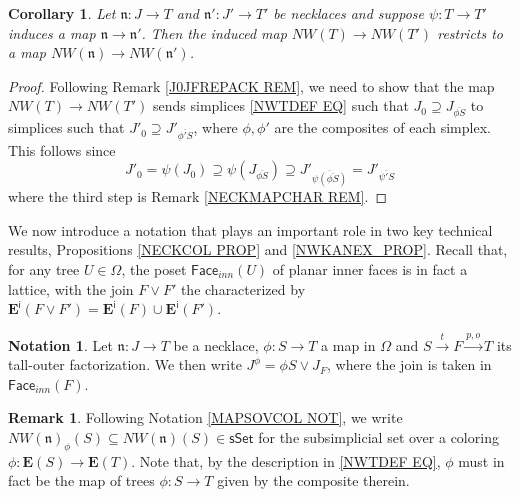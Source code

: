 \documentclass[a4paper,10pt]{article}%
\numberwithin{equation}{section}
\numberwithin{figure}{section}
\newtheorem{corollary}[equation]{Corollary}%
\theoremstyle{definition} %
\newtheorem{remark}[equation]{Remark}%
\newtheorem{notation}[equation]{Notation}%
\newcommand{\sSet}{\mathsf{sSet}}
\begin{document}
\begin{corollary}\label{NWTNS_NNAT_COR}
	Let $\mathfrak{n} \colon J \to T$ and
	$\mathfrak{n}' \colon J' \to T'$
	be necklaces and suppose 
	$\psi \colon T\to T'$
	induces a map $\mathfrak{n} \to \mathfrak{n}'$.
%	
	Then the induced map
	$NW(T) \to NW(T')$
	restricts to a map
	$NW(\mathfrak{n}) \to NW(\mathfrak{n}')$.
\end{corollary}



\begin{proof}
	Following Remark \ref{J0JFREPACK REM},
	we need to show that the map
	$NW(T) \to NW(T')$
	sends simplices \eqref{NWTDEF EQ}
	such that
	$J_0 \supseteq 
	J_{\overline{\phi S}}$
	to simplices such that
	$J'_0 \supseteq 
	J'_{\overline{\phi' S}}$,
	where $\phi,\phi'$ are the composites of each simplex.
	This follows since
\[
	J'_0 = 
	\psi (J_0) \supseteq
	\psi (J_{\overline{\phi S}})
	\supseteq
	J'_{\overline{\psi (\overline{\phi S})}}
	=
	J'_{\overline{\psi' S}}
\]	
where the third step is
Remark \ref{NECKMAPCHAR REM}.
\end{proof}



We now introduce a notation that plays an important role 
in two key technical results,
Propositions \ref{NECKCOL PROP} and 
\ref{NWKANEX_PROP}.
Recall that, for any tree 
$U \in \Omega$, 
the poset $\mathsf{Face}_{inn}(U)$
of planar inner faces is in fact a lattice,
with the join $F \vee F'$
the characterized by
$\boldsymbol{E}^{\mathsf{i}}(F \vee F') 
=
\boldsymbol{E}^{\mathsf{i}}(F)
\cup
\boldsymbol{E}^{\mathsf{i}}(F')$.


\begin{notation}\label{STAU NOT}
	Let $\mathfrak{n} \colon J \to T$
	be a necklace,
	$\phi\colon S \to T$ a map in $\Omega$
	and $S \xrightarrow{t} F \xrightarrow{p,o} T$
	its tall-outer factorization.
%
	We then write
	$J^{\phi} = \phi S \vee J_{F}$,
	where the join is 
	taken in $\mathsf{Face}_{inn}(F)$.
\end{notation}

\begin{remark}
	Following Notation \ref{MAPSOVCOL NOT},
	we write $NW(\mathfrak{n})_{\phi}(S) \subseteq NW(\mathfrak{n})(S) \in \sSet$
	for the subsimplicial set 
	over a coloring $\phi \colon \boldsymbol{E}(S) \to \boldsymbol{E}(T)$.
	Note that,
	by the description in \eqref{NWTDEF EQ},
	$\phi$ must in fact be the map of trees $\phi\colon S \to T$
	given by the composite therein.
\end{remark}
\end{document}
